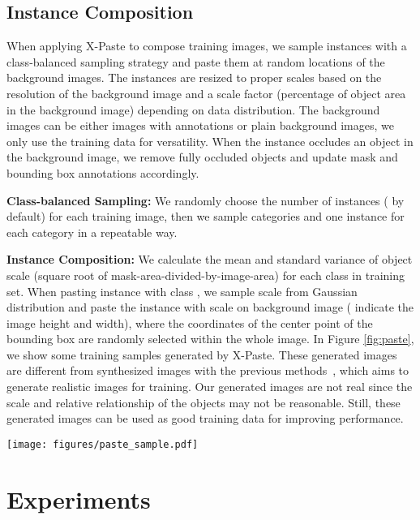 \documentclass{article}
\begin{document}
\subsection{Instance Composition} 
When applying X-Paste to compose training images, we sample instances with a class-balanced sampling strategy and paste them at random locations of the background images. The instances are resized to proper scales based on the resolution of the background image and a scale factor (percentage of object area in the background image) depending on data distribution. The background images can be either images with annotations or plain background images, we only use the training data for versatility. When the instance occludes an object in the background image, we remove fully occluded objects and update mask and bounding box annotations accordingly.

\noindent\textbf{Class-balanced Sampling:} We randomly choose the number of instances  ( by default) for each training image, then we sample  categories and one instance for each category in a repeatable way.

\noindent\textbf{Instance Composition:} We calculate the mean  and standard variance  of object scale (square root of mask-area-divided-by-image-area) for each class  in training set. When pasting instance  with class , we sample scale  from Gaussian distribution  and paste the instance with scale  on background image ( indicate the image height and width), where the coordinates of the center point of the bounding box are randomly selected within the whole image. In Figure \ref{fig:paste}, we show some training samples generated by X-Paste. These generated images are different from synthesized images with the previous methods~\cite{Instaboost, Contextual-Copy-Paste}, which aims to generate realistic images for training. Our generated images are not real since the  scale and relative relationship of the objects may not be reasonable. Still, these generated images can be used as good training data for improving performance.

\begin{figure*}
\centering
\texttt{[image: figures/paste\_sample.pdf]}
\vspace{-1em}
\caption{Visualization of training samples synthesized by X-Paste.}
\label{fig:paste}
\vspace{-1em}
\end{figure*}




\section{Experiments}
\label{sec:exp}
\end{document}
